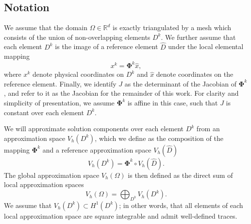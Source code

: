 \documentclass[preprint,10pt]{article}
\theoremstyle{definition}
\theoremstyle{lemma}
\theoremstyle{theorem}
\theoremstyle{assumption}
\newcommand{\LRp}[1]{\left( #1 \right)}
\newcommand{\note}[1]{{\color{blue}{#1}}}
\begin{document}


\subsection{Notation}

\note{Fix notation: switch $V_h$ to $P^N$}
We assume that the domain $\Omega \in \mathbb{R}^d$ is exactly triangulated by a mesh which consists of the union of non-overlapping elements $D^k$.  We further assume that each element $D^k$ is the image of a reference element $\widehat{D}$ under the local elemental mapping 
\[
x^k = \bm{\Phi}^k \widehat{x},
\]
where $x^k$ denote physical coordinates on $D^k$ and $\widehat{x}$ denote coordinates on the reference element.  Finally, we identify $J$ as the determinant of the Jacobian of $\bm{\Phi}^k$, and refer to it as the Jacobian for the remainder of this work.  For clarity and simplicity of presentation, we assume $\bm{\Phi}^k$ is affine in this case, such that $J$ is constant over each element $D^k$.  

We will approximate solution components over each element $D^k$ from an approximation space $V_h\LRp{D^k}$, which we define as the composition of the mapping $\bm{\Phi}^k$ and a reference approximation space $V_h\LRp{\widehat{D}}$
\[
V_h\LRp{D^k} = \bm{\Phi}^k \circ V_h\LRp{\widehat{D}}.
\]
The global approximation space $V_h\LRp{\Omega}$ is then defined as the direct sum of local approximation spaces
\[
V_h\LRp{\Omega} = \bigoplus_{D^k}V_h\LRp{D^k}.  
\]
We assume that $V_h(D^k) \subset H^1(D^k)$; in other words, that all elements of each local approximation space are square integrable and admit well-defined traces.  
\end{document}
